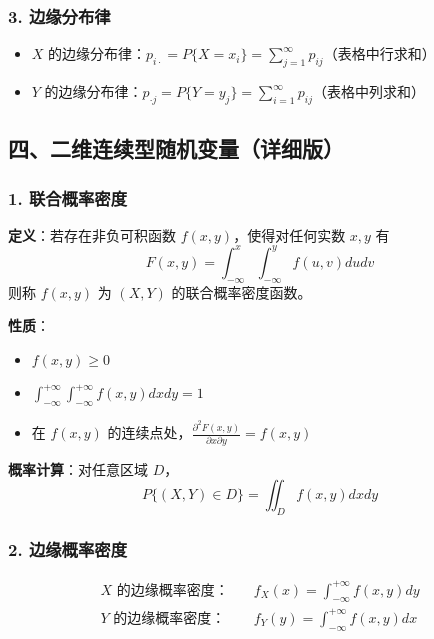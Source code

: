 \documentclass[12pt,a4paper]{ctexart}
\begin{document}
\subsubsection{3. 边缘分布律}
\begin{itemize}[noitemsep]
    \item $X$ 的边缘分布律：$\displaystyle p_{i\cdot} = P\{X = x_i\} = \sum_{j=1}^\infty p_{ij}$（表格中行求和）
    \item $Y$ 的边缘分布律：$\displaystyle p_{\cdot j} = P\{Y = y_j\} = \sum_{i=1}^\infty p_{ij}$（表格中列求和）
\end{itemize}

\subsection{四、二维连续型随机变量（详细版）}

\subsubsection{1. 联合概率密度}
\textbf{定义}：若存在非负可积函数 $f(x, y)$，使得对任何实数 $x, y$ 有
\[
    F(x, y) = \int_{-\infty}^x \int_{-\infty}^y f(u, v) du dv
\]
则称 $f(x, y)$ 为 $(X, Y)$ 的联合概率密度函数。

\textbf{性质}：
\begin{itemize}[noitemsep]
    \item $f(x, y) \ge 0$
    \item $\int_{-\infty}^{+\infty} \int_{-\infty}^{+\infty} f(x, y) dx dy = 1$
    \item 在 $f(x, y)$ 的连续点处，$\frac{\partial^2 F(x, y)}{\partial x \partial y} = f(x, y)$
\end{itemize}

\textbf{概率计算}：对任意区域 $D$，
\[
    P\{(X, Y) \in D\} = \iint_D f(x, y) dx dy
\]

\subsubsection{2. 边缘概率密度}
\begin{align*}
    X\text{ 的边缘概率密度：} & \quad f_X(x) = \int_{-\infty}^{+\infty} f(x, y) dy \\
    Y\text{ 的边缘概率密度：} & \quad f_Y(y) = \int_{-\infty}^{+\infty} f(x, y) dx
\end{align*}

\end{document}
